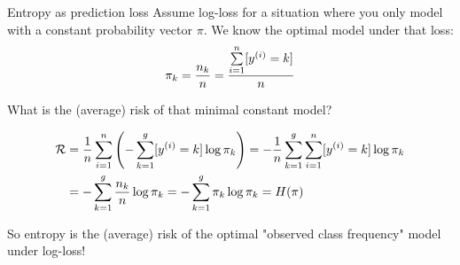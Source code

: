 \documentclass[11pt,compress,t,notes=noshow, xcolor=table]{beamer}
\begin{document}
\begin{vbframe}{Entropy as prediction loss}
Assume log-loss for a situation where you only model with a constant probability vector $\pi$. We know the optimal model under that loss: 
$$\pi_{k} = \frac{n_k}{n} = \frac{\sum\limits_{i=1}^n [y^{(i)} = k]}{n}$$

What is the (average) risk of that minimal constant model?

\begin{align*}
  \mathcal{R} &= \frac{1}{n} \sum\limits_{i=1}^n \left( -\sum\limits_{k=1}^g [y^{(i)} = k]\log \pi_{k} \right) = - \frac{1}{n} \sum\limits_{k=1}^g \sum\limits_{i=1}^n [y^{(i)} = k]\log \pi_{k}  \\
        &= -\sum\limits_{k=1}^g \frac{n_k}{n}\log \pi_{k} = -\sum\limits_{k=1}^g \pi_k \log \pi_{k} = H(\pi) 
\end{align*}

So entropy is the (average) risk of the optimal "observed class frequency" model under log-loss! 
 
\end{vbframe}

  
\endlecture
\end{document}
